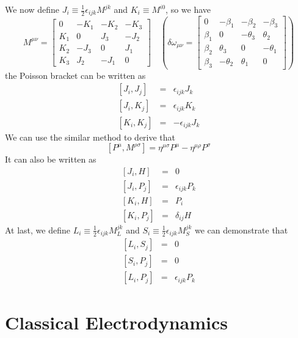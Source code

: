We now define $J_i \equiv \frac{1}{2} \epsilon_{ijk} M^{jk}$ and $K_i \equiv M^{i0}$, so we have
\[M^{\mu \nu} = \left[ 
\begin{matrix} 
0   & -K_1 & -K_2 & -K_3 \\ 
K_1 & 0    & J_3  & -J_2 \\
K_2 & -J_3 & 0    &  J_1 \\
K_3 & J_2  & -J_1 &  0
\end{matrix} 
\right] \quad \left( 
\delta \omega_{\mu\nu} = \left[
\begin{matrix} 
0       & -\beta_1   & -\beta_2   & -\beta_3   \\ 
\beta_1 & 0         & -\theta_3 & \theta_2  \\
\beta_2 & \theta_3  & 0         & -\theta_1 \\
\beta_3 & -\theta_2 & \theta_1  & 0
\end{matrix} 
\right] \right)\] 
the Poisson bracket can be written as
\begin{eqnarray}
	\left[J_i,J_j\right] &=& \epsilon_{ijk}J_k \nonumber \\
	\left[J_i,K_j\right] &=& \epsilon_{ijk}K_k \nonumber \\
	\left[K_i,K_j\right] &=& -\epsilon_{ijk}J_k \nonumber
\end{eqnarray}
We can use the similar method to derive that
\[[P^{\mu},M^{\rho \sigma}] = \eta^{\mu \sigma}P^{\mu} - \eta^{\mu \rho}P^{\sigma}\]
It can also be written as
\begin{eqnarray}
	\left[J_i,H\right] &=& 0 \nonumber \\
	\left[J_i,P_j\right] &=& \epsilon_{ijk}P_k \nonumber \\
	\left[K_i,H\right] &=& P_i \nonumber \\
	\left[K_i,P_j\right] &=& \delta_{ij}H \nonumber
\end{eqnarray}
At last, we define $L_i \equiv \frac{1}{2} \epsilon_{ijk} M_L^{jk}$ and $S_i \equiv \frac{1}{2} \epsilon_{ijk} M_S^{jk}$
we can demonstrate that
\begin{eqnarray}
	\left[L_i,S_j\right] &=& 0 \nonumber \\
	\left[S_i,P_j\right] &=& 0 \nonumber \\
	\left[L_i,P_j\right] &=& \epsilon_{ijk}P_k \nonumber
\end{eqnarray}

\chapter{Classical Electrodynamics}
